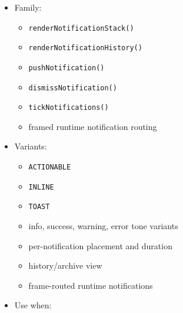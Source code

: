 \begin{itemize}
\tightlist
\item
  Family:

  \begin{itemize}
  \tightlist
  \item
    \texttt{r\allowbreak{}e\allowbreak{}n\allowbreak{}d\allowbreak{}e\allowbreak{}r\allowbreak{}N\allowbreak{}o\allowbreak{}t\allowbreak{}i\allowbreak{}f\allowbreak{}i\allowbreak{}c\allowbreak{}a\allowbreak{}t\allowbreak{}i\allowbreak{}o\allowbreak{}n\allowbreak{}S\allowbreak{}t\allowbreak{}a\allowbreak{}c\allowbreak{}k\allowbreak{}(\allowbreak{})}
  \item
    \texttt{r\allowbreak{}e\allowbreak{}n\allowbreak{}d\allowbreak{}e\allowbreak{}r\allowbreak{}N\allowbreak{}o\allowbreak{}t\allowbreak{}i\allowbreak{}f\allowbreak{}i\allowbreak{}c\allowbreak{}a\allowbreak{}t\allowbreak{}i\allowbreak{}o\allowbreak{}n\allowbreak{}H\allowbreak{}i\allowbreak{}s\allowbreak{}t\allowbreak{}o\allowbreak{}r\allowbreak{}y\allowbreak{}(\allowbreak{})}
  \item
    \texttt{p\allowbreak{}u\allowbreak{}s\allowbreak{}h\allowbreak{}N\allowbreak{}o\allowbreak{}t\allowbreak{}i\allowbreak{}f\allowbreak{}i\allowbreak{}c\allowbreak{}a\allowbreak{}t\allowbreak{}i\allowbreak{}o\allowbreak{}n\allowbreak{}(\allowbreak{})}
  \item
    \texttt{d\allowbreak{}i\allowbreak{}s\allowbreak{}m\allowbreak{}i\allowbreak{}s\allowbreak{}s\allowbreak{}N\allowbreak{}o\allowbreak{}t\allowbreak{}i\allowbreak{}f\allowbreak{}i\allowbreak{}c\allowbreak{}a\allowbreak{}t\allowbreak{}i\allowbreak{}o\allowbreak{}n\allowbreak{}(\allowbreak{})}
  \item
    \texttt{t\allowbreak{}i\allowbreak{}c\allowbreak{}k\allowbreak{}N\allowbreak{}o\allowbreak{}t\allowbreak{}i\allowbreak{}f\allowbreak{}i\allowbreak{}c\allowbreak{}a\allowbreak{}t\allowbreak{}i\allowbreak{}o\allowbreak{}n\allowbreak{}s\allowbreak{}(\allowbreak{})}
  \item
    framed runtime notification routing
  \end{itemize}
\item
  Variants:

  \begin{itemize}
  \tightlist
  \item
    \texttt{A\allowbreak{}C\allowbreak{}T\allowbreak{}I\allowbreak{}O\allowbreak{}N\allowbreak{}A\allowbreak{}B\allowbreak{}L\allowbreak{}E}
  \item
    \texttt{I\allowbreak{}N\allowbreak{}L\allowbreak{}I\allowbreak{}N\allowbreak{}E}
  \item
    \texttt{T\allowbreak{}O\allowbreak{}A\allowbreak{}S\allowbreak{}T}
  \item
    info, success, warning, error tone variants
  \item
    per-notification placement and duration
  \item
    history/archive view
  \item
    frame-routed runtime notifications
  \end{itemize}
\item
  Use when:


\end{itemize}
